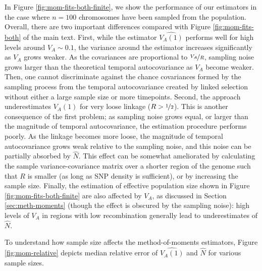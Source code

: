\documentclass[11pt]{article}
\begin{document}
In Figure \ref{fig:mom-fits-both-finite}, we show the performance of our
estimators in the case where $n=100$ chromosomes have been sampled from the
population. Overall, there are two important differences compared with Figure
\ref{fig:mom-fits-both} of the main text. First, while the estimator
$\widehat{V_A(1)}$ performs well for high levels around $V_A \sim 0.1$, the
variance around the estimator increases significantly as $V_A$ grows weaker.
As the covariances are proportional to $\nicefrac{V_A}{R}$, sampling noise
grows larger than the theoretical temporal autocovariance as $V_A$ become weaker.
Then, one cannot discriminate against the chance covariances formed by the
sampling process from the temporal autocovariance created by linked selection
without either a large sample size or more timepoints. Second, the approach
underestimates $V_A(1)$ for very loose linkage ($R > \nicefrac{1}{2}$). This is
another consequence of the first problem; as sampling noise grows equal, or
larger than the magnitude of temporal autocovariance, the estimation procedure
performs poorly. As the linkage becomes more loose, the magnitude of temporal
autocovariance grows weak relative to the sampling noise, and this noise can be
partially absorbed by $\widehat{N}$. This effect can be somewhat ameliorated by
calculating the sample variance-covariance matrix over a shorter region of the
genome such that $R$ is smaller (as long as SNP density is sufficient), or by
increasing the sample size. Finally, the estimation of effective population
size shown in Figure \ref{fig:mom-fits-both-finite} are also affected by $V_A$,
as discussed in Section \ref{sec:meth-moments} (though the effect is obscured
by the sampling noise): high levels of $V_A$ in regions with low recombination
generally lead to underestimates of $\widehat{N}$.

To understand how sample size affects the method-of-moments estimators, Figure
\ref{fig:mom-relative} depicts median relative error of $\widehat{V_A(1)}$ and
$\widehat{N}$ for various sample sizes.
\end{document}
